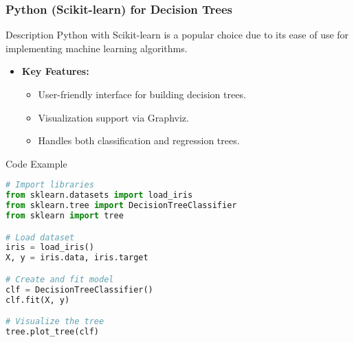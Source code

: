 \documentclass[aspectratio=169]{beamer}
\begin{document}
\begin{frame}[fragile]
    \frametitle{Python (Scikit-learn) for Decision Trees}
    \begin{block}{Description}
        Python with Scikit-learn is a popular choice due to its ease of use for implementing machine learning algorithms.
    \end{block}
    \begin{itemize}
        \item \textbf{Key Features:}
            \begin{itemize}
                \item User-friendly interface for building decision trees.
                \item Visualization support via Graphviz.
                \item Handles both classification and regression trees.
            \end{itemize}
    \end{itemize}
    \begin{block}{Code Example}
    \begin{lstlisting}[language=Python]
# Import libraries
from sklearn.datasets import load_iris
from sklearn.tree import DecisionTreeClassifier
from sklearn import tree

# Load dataset
iris = load_iris()
X, y = iris.data, iris.target

# Create and fit model
clf = DecisionTreeClassifier()
clf.fit(X, y)

# Visualize the tree
tree.plot_tree(clf)
    \end{lstlisting}
    \end{block}
\end{frame}
\end{document}
